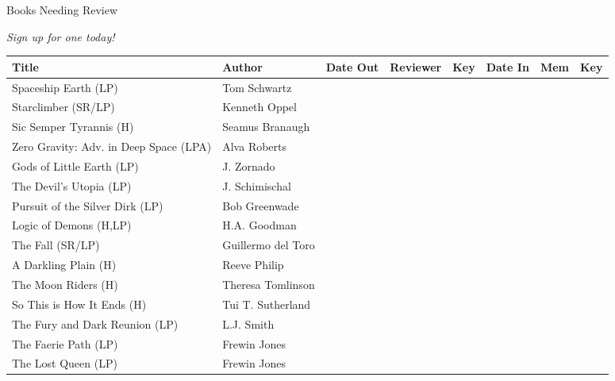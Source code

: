 \documentclass{article}
\begin{document}
\begin{center}
{\Huge Books Needing Review}

\vspace{1cm}

{\LARGE \em Sign up for one today!}

\vspace{1cm}

\begin{adjustwidth}{-2cm}{-2cm}
\begin{center}


\begin{tabular}{|p{2.7in}|p{1.3in}|c|p{1in}|c|c|c|c|}
\hline
Title & Author & Date Out & Reviewer & Key & Date In & Mem & Key \\
\hline
Spaceship Earth (LP) & Tom Schwartz &&&&&& \\ \hline
Starclimber (SR/LP) & Kenneth Oppel &&&&&& \\ \hline
Sic Semper Tyrannis (H) & Seamus Branaugh &&&&&& \\ \hline
Zero Gravity: Adv. in Deep Space (LPA) & Alva Roberts &&&&&& \\ \hline
Gods of Little Earth (LP) & J. Zornado &&&&&& \\ \hline

The Devil's Utopia (LP) & J. Schimischal &&&&&& \\ \hline
Pursuit of the Silver Dirk (LP) & Bob Greenwade &&&&&& \\ \hline
Logic of Demons (H,LP) & H.A. Goodman &&&&&& \\ \hline
The Fall (SR/LP) & Guillermo del Toro &&&&&& \\ \hline
A Darkling Plain (H) & Reeve Philip &&&&&& \\ \hline

The Moon Riders (H) & Theresa Tomlinson &&&&&& \\ \hline
So This is How It Ends (H) & Tui T. Sutherland &&&&&& \\ \hline
The Fury and Dark Reunion (LP) & L.J. Smith &&&&&& \\ \hline
The Faerie Path (LP) & Frewin Jones &&&&&& \\ \hline
The Lost Queen (LP) & Frewin Jones &&&&&& \\ \hline


\end{tabular}
\end{center}
\end{adjustwidth}
\end{center}
\end{document}
